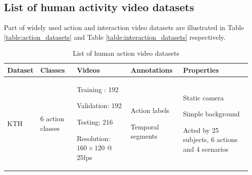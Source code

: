 \subsection{List of human activity video datasets}
Part of widely used action and interaction video datasets are illustrated in Table \ref{table:action_datasets} and Table \ref{table:interaction_datasets} respectively.
\begin{table}
	\caption{List of human action video datasets}
	\begin{center}
		\begin{tabular}{| p{2.5cm} | p{1.5cm} | p{4cm} | p{3cm} | p{4cm} |}
			\hline
			Dataset & Classes & Videos & Annotations & Properties \\ \hline \hline
			KTH\cite{kth} 
			& %
			6 action classes 
			& %
			\vspace{-5mm}
			\begin{myitemize}
				\item Training : 192
				\item Validation: 192
				\item Testing: 216
				\item Resolution: \(160 \times 120\) @ 25fps
			\end{myitemize}
            & %
			\vspace{-5mm}
			\begin{myitemize}
				\item Action labels
				\item Temporal segments
			\end{myitemize}
	    	& %
	    	\vspace{-5mm}
	    	\begin{myitemize}
	    		\item Static camera
	    		\item Simple background
	    		\item Acted by 25 subjects, 6 actions and 4 scenarios
	    	\end{myitemize}
    		\\ \hline 
	    	

\end{tabular}
\end{center}
\end{table}
